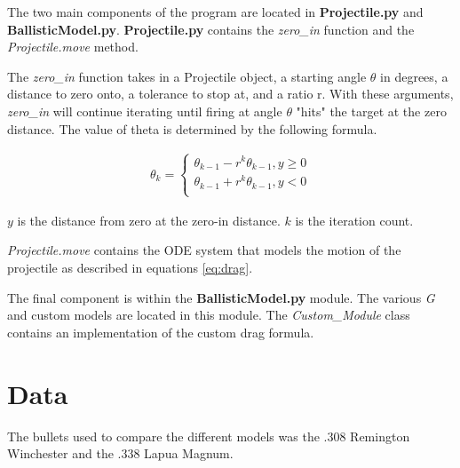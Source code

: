 \documentclass{article}%
\begin{document}
    The two main components of the program are located in {\bf Projectile.py} and {\bf BallisticModel.py}. 
    {\bf Projectile.py} contains the {\em zero\_in} function and the {\em Projectile.move} method. 

    The {\em zero\_in} function takes in a Projectile object, a starting angle $\theta$ in degrees, a distance to zero onto, a tolerance to stop at, and a ratio r. With these arguments, {\em zero\_in} will continue iterating until firing at angle $\theta$ "hits" the target at the zero distance. The value of theta is determined by the following formula. 

    \begin{align*}
       \theta_k = \begin{cases}
            \theta_{k - 1} - r^k\theta_{k - 1}, y \geq 0\\
            \theta_{k - 1} + r^k\theta_{k - 1}, y < 0\\
        \end{cases}
    \end{align*}

    $y$ is the distance from zero at the zero-in distance. $k$ is the iteration count. 

    {\em Projectile.move} contains the ODE system that models the motion of the projectile as described in equations \ref{eq:drag}. 

    The final component is within the {\bf BallisticModel.py} module. The various {\em G} and custom models are located in this module. The {\em Custom\_Module} class contains an implementation of the custom drag formula. 

    \section{Data}
    The bullets used to compare the different models was the .308 Remington Winchester and the .338 Lapua Magnum. 
\end{document}

